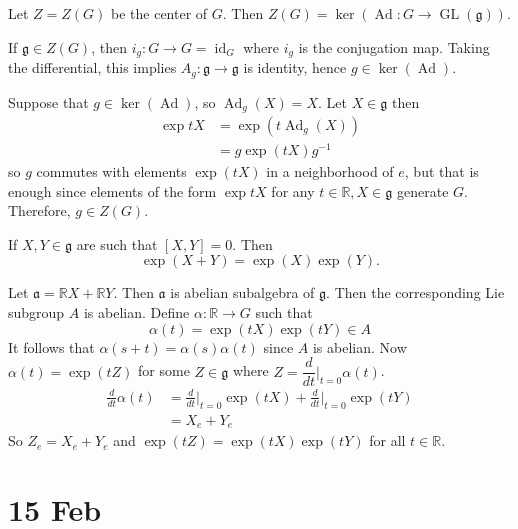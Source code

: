 \documentclass[11pt,a4paper]{scrarticle}
\theoremstyle{definition}
\renewenvironment{proof}[1][\proofname]{\vspace{-10pt}\begin{myproof}}{\end{myproof}}
\theoremstyle{greenbox}
\newcommand{\R}{\mathbb{R}}
\newcommand{\ag}{\mathfrak{a}}
\newcommand{\fg}{\mathfrak{g}}
\begin{document}
\begin{thm}
    Let $ Z = Z(G) $ be the center of $ G $. Then $ Z(G) = \ker ( \operatorname{Ad} : G \to \operatorname{GL}(\fg)) $.
\end{thm}
\begin{proof}
    If $ \fg \in Z(G) $, then $ i_{g}: G \to G = \operatorname{id}_{G} $ where $ i_{g} $ is the conjugation map. Taking the differential, this implies $ A_{g} : \fg  \to \fg$ is identity, hence $ g \in \ker( \operatorname{Ad}) $. 

    Suppose that $ g \in \ker( \operatorname{Ad}) $, %
    so $ \operatorname{Ad}_{g}(X) = X $. Let $ X \in \fg $ then \begin{align*}
        \exp tX & = \exp (t \operatorname{Ad}_{g}(X)) \\
        & = g \exp(tX) g^{-1}
    \end{align*}
    so $ g $ commutes with elements $ \exp(tX) $ in a neighborhood of $ e $, but that is enough since elements of the form $ \exp tX $ for any $ t \in \R, X \in \fg$ generate $ G $. Therefore, $ g \in Z(G) $. 
\end{proof}

\begin{proposition}
    If $ X,Y \in \fg $ are such that $ [X,Y] = 0 $. Then 
    \[ \exp(X+Y) = \exp(X) \exp(Y) .\]
\end{proposition}
\begin{proof}
    Let $ \ag = \R X+ \R Y $. Then $ \ag $ is abelian subalgebra of $ \fg $. Then the corresponding Lie subgroup $ A $ is abelian. Define $ \alpha : \R \to G $ such that 
    \[ \alpha(t) = \exp(tX) \exp(tY) \in A\]
    It follows that $ \alpha(s+t) = \alpha(s) \alpha(t) $ since $ A $ is abelian. Now $ \alpha (t) = \exp(tZ) $ for some $ Z \in \fg $ where $ Z = \dfrac{d}{dt}\bigg|_{t=0} \alpha(t)$. \begin{align*}
        \frac{d}{dt} \alpha(t) & = \frac{d}{dt}\bigg|_{t=0} \exp(tX)+ \frac{d}{dt}\bigg|_{t=0} \exp(tY) \\
        & = X_{e}+Y_{e} 
    \end{align*}
    So $ Z_{e} = X_{e}+ Y_{e} $ and $ \exp(tZ) = \exp(tX) \exp(tY) $ for all $ t \in \R $.
\end{proof}

\section{15 Feb}
\end{document}
